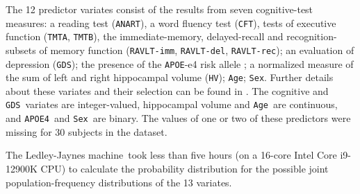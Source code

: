 \documentclass[utf8]{FrontiersinHarvard} %
\renewcommand*{\|}[1][]{\nonscript\:#1\vert\nonscript\:\mathopen{}}
\newcommand*{\age}{\texttt{Age}}
\newcommand*{\sex}{\texttt{Sex}}
\newcommand*{\apoe}{\texttt{APOE4}}
\newcommand*{\hv}{\texttt{HV}}
\newcommand*{\anart}{\texttt{ANART}}
\newcommand*{\cft}{\texttt{CFT}}
\newcommand*{\gds}{\texttt{GDS}}
\newcommand*{\ravltimm}{\texttt{RAVLT-imm}}
\newcommand*{\ravltdel}{\texttt{RAVLT-del}}
\newcommand*{\ravltrec}{\texttt{RAVLT-rec}}
\newcommand*{\tmta}{\texttt{TMTA}}
\newcommand*{\tmtb}{\texttt{TMTB}}
\newcommand*{\ljm}{Ledley-Jaynes machine}
\begin{document}
The 12 predictor variates consist of the results from seven cognitive-test measures: a reading test (\anart), a word fluency test (\cft), tests of executive function (\tmta, \tmtb), the immediate-memory, delayed-recall and recognition-subsets of memory function (\ravltimm, \ravltdel, \ravltrec); an evaluation of depression (\gds); the presence of the \texttt{APOE}-e4 risk allele \citep{liuetal2013}; a normalized measure of the sum of left and right hippocampal volume (\hv); \age; \sex. Further details about these variates and their selection can be found in \citet{ryeetal2022}. The cognitive and \gds\ variates are integer-valued, hippocampal volume and \age\ are continuous, and \apoe\ and \sex\ are binary. The values of one or two of these predictors were missing for 30 subjects in the dataset.


The \ljm\ took less than five hours (on a 16-core Intel Core i9-12900K CPU) to calculate the probability distribution for the possible joint population-frequency distributions of the 13 variates.
\end{document}
